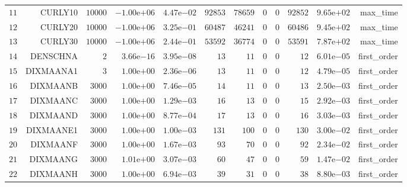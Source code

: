 \begin{longtable}{rrrrrrrrrrrr}
  \(    11\) & CURLY10 & \( 10000\) & \(-1.00\)e\(+06\) & \( 4.47\)e\(-02\) & \( 92853\) & \( 78659\) & \(     0\) & \(     0\) & \( 92852\) & \( 9.65\)e\(+02\) & max\_time \\
  \(    12\) & CURLY20 & \( 10000\) & \(-1.00\)e\(+06\) & \( 3.25\)e\(-01\) & \( 60487\) & \( 46241\) & \(     0\) & \(     0\) & \( 60486\) & \( 9.45\)e\(+02\) & max\_time \\
  \(    13\) & CURLY30 & \( 10000\) & \(-1.00\)e\(+06\) & \( 2.44\)e\(-01\) & \( 53592\) & \( 36774\) & \(     0\) & \(     0\) & \( 53591\) & \( 7.87\)e\(+02\) & max\_time \\
  \(    14\) & DENSCHNA & \(     2\) & \( 3.66\)e\(-16\) & \( 3.95\)e\(-08\) & \(    13\) & \(    11\) & \(     0\) & \(     0\) & \(    12\) & \( 6.01\)e\(-05\) & first\_order \\
  \(    15\) & DIXMAANA1 & \(     3\) & \( 1.00\)e\(+00\) & \( 2.36\)e\(-06\) & \(    13\) & \(    11\) & \(     0\) & \(     0\) & \(    12\) & \( 4.79\)e\(-05\) & first\_order \\
  \(    16\) & DIXMAANB & \(  3000\) & \( 1.00\)e\(+00\) & \( 7.46\)e\(-05\) & \(    14\) & \(    11\) & \(     0\) & \(     0\) & \(    13\) & \( 2.50\)e\(-03\) & first\_order \\
  \(    17\) & DIXMAANC & \(  3000\) & \( 1.00\)e\(+00\) & \( 1.29\)e\(-03\) & \(    16\) & \(    13\) & \(     0\) & \(     0\) & \(    15\) & \( 2.92\)e\(-03\) & first\_order \\
  \(    18\) & DIXMAAND & \(  3000\) & \( 1.00\)e\(+00\) & \( 8.77\)e\(-04\) & \(    17\) & \(    13\) & \(     0\) & \(     0\) & \(    16\) & \( 3.03\)e\(-03\) & first\_order \\
  \(    19\) & DIXMAANE1 & \(  3000\) & \( 1.00\)e\(+00\) & \( 1.00\)e\(-03\) & \(   131\) & \(   100\) & \(     0\) & \(     0\) & \(   130\) & \( 3.00\)e\(-02\) & first\_order \\
  \(    20\) & DIXMAANF & \(  3000\) & \( 1.00\)e\(+00\) & \( 1.67\)e\(-03\) & \(    93\) & \(    70\) & \(     0\) & \(     0\) & \(    92\) & \( 2.34\)e\(-02\) & first\_order \\
  \(    21\) & DIXMAANG & \(  3000\) & \( 1.01\)e\(+00\) & \( 3.07\)e\(-03\) & \(    60\) & \(    47\) & \(     0\) & \(     0\) & \(    59\) & \( 1.47\)e\(-02\) & first\_order \\
  \(    22\) & DIXMAANH & \(  3000\) & \( 1.00\)e\(+00\) & \( 6.94\)e\(-03\) & \(    39\) & \(    31\) & \(     0\) & \(     0\) & \(    38\) & \( 8.80\)e\(-03\) & first\_order \\

\end{longtable}
